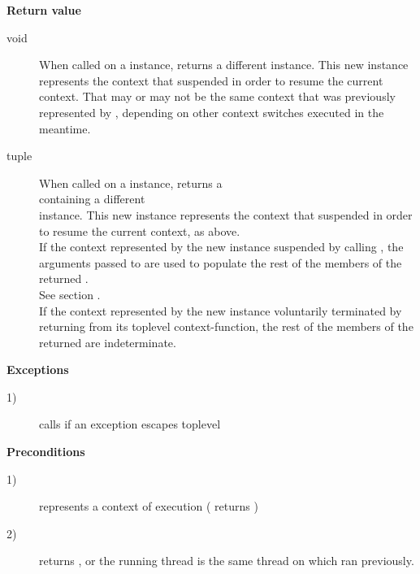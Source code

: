 {\bfseries Return value}
\begin{description}
    \item[void]     When called on a \ectxvoid instance, \op returns
                    a different \ectxvoid instance. This new instance
                    represents the context that suspended in order to resume
                    the current context. That may or may not be the same
                    context that was previously represented by ,
                    depending on other context switches executed in the
                    meantime.
    \item[tuple]    When called on a \ectxargs instance, \op returns a\\
                    \ectxargstup containing a different\\
                    \ectxargs instance. This new instance represents the
                    context that suspended in order to resume the current
                    context, as above.\\
                    If the context represented by the new \ectxargs instance
                    suspended by calling \op, the arguments passed to \op are
                    used to populate the rest of the members of the
                    returned .\\
                    See section .\\
                    If the context represented by the new \ectxargs instance
                    voluntarily terminated by returning from its toplevel
                    context-function, the rest of the members of the
                    returned  are indeterminate.\\
\end{description}

{\bfseries Exceptions}
\begin{description}
    \item[1)] calls  if an exception escapes toplevel \\
\end{description}

{\bfseries Preconditions}
\begin{description}
    \item[1)]  represents a context of execution (\opbool
              returns )
    \item[2)]  returns , or the running thread is
              the same thread on which  ran previously.
\end{description}

